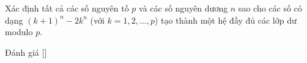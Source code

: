 \ifshowproblem
\begin{problem}\label{problem:HUN-2015-TST-KMA-640}
    Xác định tất cả các số nguyên tố $p$ và các số nguyên dương $n$ sao cho các số có dạng $(k+1)^n - 2k^n$ (với $k = 1, 2, \ldots, p$)
    tạo thành một hệ đầy đủ các lớp dư modulo $p$.
\end{problem}
\fi

\ifshowinfo
Đánh giá [\textbf{}]
\fi
